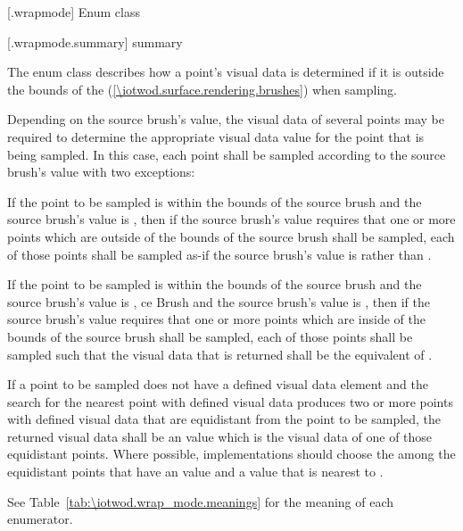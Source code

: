  [\iotwod.wrapmode] {Enum class }

 [\iotwod.wrapmode.summary] { summary}

\pnum
The  enum class describes how a point's visual data is 
determined if it is outside the bounds of the  (\ref{\iotwod.surface.rendering.brushes}) when sampling.

\pnum
Depending on the source brush's  value, the visual data of several points may be required to determine the appropriate visual data value for the point that is being sampled. In this case, each point shall be sampled according to the source brush's  value with two exceptions:
\begin{enumeratea}
\item If the point to be sampled is within the bounds of the source brush and the source brush's  value is , then if the source brush's  value requires that one or more points which are outside of the bounds of the source brush shall be sampled, each of those points shall be sampled as-if the source brush's  value is  rather than .
\item If the point to be sampled is within the bounds of the source brush and the source brush's  value is , ce Brush and the source brush's  value is , then if the source brush's  value requires that one or more points which are inside of the bounds of the source brush shall be sampled, each of those points shall be sampled such that the visual data that is returned shall be the equivalent of .
\end{enumeratea}

\pnum
If a point to be sampled does not have a defined visual data element and the search for the nearest point with defined visual data produces two or more points with defined visual data that are equidistant from the point to be sampled, the returned visual data shall be an \unspecnorm value which is the visual data of one of those equidistant points. Where possible, implementations should choose the among the equidistant points that have an \xaxis value and a \yaxis value that is nearest to .

\pnum
See Table~\ref{tab:\iotwod.wrap_mode.meanings} for the meaning of each  enumerator.

